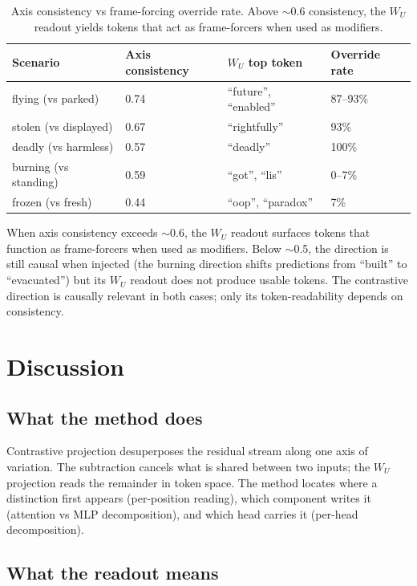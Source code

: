 \documentclass[11pt]{article}
\newcommand{\WU}{W_U}
\begin{document}
\begin{table}[htbp]
\centering
\small
\begin{tabular}{llll}
\toprule
Scenario & Axis consistency & $\WU$ top token & Override rate \\
\midrule
flying (vs parked) & 0.74 & ``future'', ``enabled'' & 87--93\% \\
stolen (vs displayed) & 0.67 & ``rightfully'' & 93\% \\
deadly (vs harmless) & 0.57 & ``deadly'' & 100\% \\
burning (vs standing) & 0.59 & ``got'', ``lis'' & 0--7\% \\
frozen (vs fresh) & 0.44 & ``oop'', ``paradox'' & 7\% \\
\bottomrule
\end{tabular}
\caption{Axis consistency vs frame-forcing override rate. Above $\sim$0.6 consistency, the $\WU$ readout yields tokens that act as frame-forcers when used as modifiers.}
\label{tab:override}
\end{table}

When axis consistency exceeds $\sim$0.6, the $\WU$ readout surfaces tokens that
function as frame-forcers when used as modifiers. Below $\sim$0.5, the direction is
still causal when injected (the burning direction shifts predictions from
``built'' to ``evacuated'') but its $\WU$ readout does not produce usable tokens.
The contrastive direction is causally relevant in both cases; only its
token-readability depends on consistency.

\section{Discussion}

\subsection{What the method does}

Contrastive projection desuperposes the residual stream along one axis
of variation. The subtraction cancels what is shared between two inputs;
the $\WU$ projection reads the remainder in token space. The method locates
where a distinction first appears (per-position reading), which component
writes it (attention vs MLP decomposition), and which head carries it
(per-head decomposition).

\subsection{What the readout means}
\end{document}
